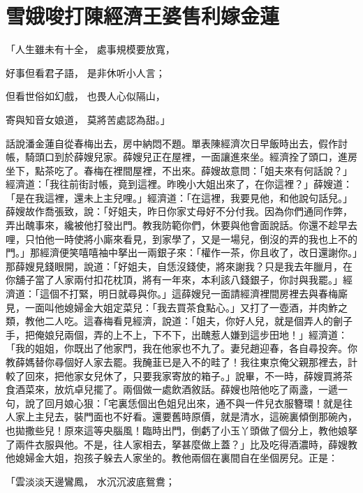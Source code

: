 %

\chapter{雪娥唆打陳經濟\KG 王婆售利嫁金蓮}

「人生雖未有十全，  處事規模要放寬，

好事但看君子語，  是非休听小人言；

但看世俗如幻戲，  也畏人心似隔山，

寄與知音女娘道，  莫將苦處認為甜。」

話說潘金蓮自從春梅出去，房中納悶不題。單表陳經濟次日早飯時出去，假作討帳，騎頭口到於薛嫂兒家。薛嫂兒正在屋裡，一面讓進來坐。經濟拴了頭口，進房坐下，點茶吃了。春梅在裡間屋裡，不出來。薛嫂故意問：「姐夫來有何話說？」經濟道：「我往前街討帳，竟到這裡。昨晚小大姐出來了，在你這裡？」薛嫂道：「是在我這裡，還未上主兒哩。」經濟道：「在這裡，我要見他，和他說句話兒。」薛嫂故作喬張致，說：「好姐夫，昨日你家丈母好不分付我。因為你們通同作弊，弄出醜事來，纔被他打發出門。教我防範你們，休要與他會面說話。你還不趁早去哩，只怕他一時使將小廝來看見，到家學了，又是一場兒，倒沒的弄的我也上不的門。」那經濟便笑嘻嘻袖中拏出一兩銀子來：「權作一茶，你且收了，改日還謝你。」那薛嫂見錢眼開，說道：「好姐夫，自恁沒錢使，將來謝我？只是我去年臘月，在你舖子當了人家兩付扣花枕頂，將有一年來，本利該八錢銀子，你討與我罷。」經濟道：「這個不打緊，明日就尋與你。」這薛嫂兒一面請經濟裡間房裡去與春梅廝見，一面叫他媳婦金大姐定菜兒：「我去買茶食點心。」又打了一壺酒，并肉鮓之類，教他二人吃。這春梅看見經濟，說道：「姐夫，你好人兒，就是個弄人的劊子手，把俺娘兒兩個，弄的上不上，下不下，出醜惹人嫌到這步田地！」經濟道：「我的姐姐，你既出了他家門，我在他家也不九了。妻兒趙迎春，各自尋投奔。你教薛媽替你尋個好人家去罷。我醃韮已是入不的畦了！我往東京俺父親那裡去，計較了回來，把他家女兒休了，只要我家寄放的箱子。」說畢，不一時，薛嫂買將茶食酒菜來，放炕卓兒擺了。兩個做一處飲酒敘話。薛嫂也陪他吃了兩盞，一遞一句，說了回月娘心狠：「宅裏恁個出色姐兒出來，通不與一件兒衣服簪環！就是往人家上主兒去，裝門面也不好看。還要舊時原價，就是清水，這碗裏傾倒那碗內，也拋撒些兒！原來這等央腦風！臨時出門，倒虧了小玉丫頭做了個分上，教他娘拏了兩件衣服與他。不是，往人家相去，拏甚麼做上蓋？」比及吃得酒濃時，薛嫂教他媳婦金大姐，抱孩子躲去人家坐的。教他兩個在裏間自在坐個房兒。正是：

「雲淡淡天邊鸞鳳，  水沉沉波底鴛鴦；

